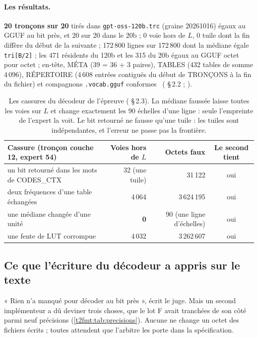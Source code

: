 \paragraph{Les résultats.} \textbf{20 tronçons sur 20} tirés dans \texttt{gpt-oss-120b.trc} (graine 20261016) égaux au GGUF au bit près, et 20 sur 20 dans le 20b ; 0 voie hors de $L$, 0 tuile dont la fin diffère du début de la suivante ; 172\,800 lignes sur 172\,800 dont la médiane égale \texttt{tri[B/2]} ; les 471 résidents du 120b et les 315 du 20b égaux au GGUF octet pour octet ; en-tête, MÉTA (39 = 36 + 3 paires), TABLES (432 tables de somme 4\,096), RÉPERTOIRE (4\,608 entrées contiguës du début de TRONÇONS à la fin du fichier) et compagnons \texttt{.vocab.gguf} conformes \mes~( §\,2.2 ; ).

\begin{table}[ht]
\centering\small
\begin{tabularx}{\linewidth}{>{\raggedright\arraybackslash}X r r c}
\toprule
Cassure (tronçon couche 12, expert 54) & Voies hors de $L$ & Octets faux & Le second tient \\
\midrule
un bit retourné dans les mots de CODES\_CTX & 32 (une tuile) & 31\,122 & oui \\
deux fréquences d'une table échangées & 4\,064 & 3\,624\,195 & oui \\
une médiane changée d'une unité & \textbf{0} & 90 (une ligne d'échelles) & oui \\
une fente de LUT corrompue & 4\,032 & 3\,262\,607 & oui \\
\bottomrule
\end{tabularx}
\caption[Les cassures du décodeur de l'épreuve]{Les cassures du décodeur de l'épreuve ( §\,2.3). La médiane faussée laisse toutes les voies sur $L$ et change exactement les 90 échelles d'une ligne : seule l'empreinte de l'expert la voit. Le bit retourné ne fausse qu'une tuile : les tuiles sont indépendantes, et l'erreur ne passe pas la frontière.}
\label{t2fmt:tab:cassures-s4}
\end{table}

\subsection{Ce que l'écriture du décodeur a appris sur le texte}

« Rien n'a manqué pour décoder au bit près », écrit le juge. Mais un second implémenteur a dû deviner trois choses, que le lot F avait tranchées de son côté parmi neuf précisions (\cref{t2fmt:tab:precisions}). Aucune ne change un octet des fichiers écrits ; toutes attendent que l'arbitre les porte dans la spécification.

